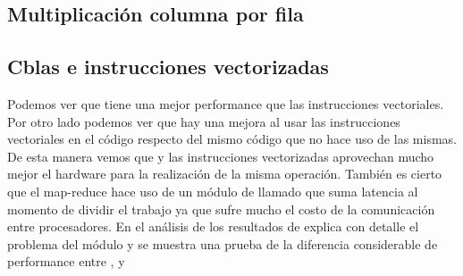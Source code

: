 \subsection{Multiplicación columna por fila}

    \def\model{ColumnByRow}
    \def\analisisAmdahl{
    Podemos observar que el speed up teórico tiende al máximo speed-up
    mientras que el real nos muestra que no usa toda la paralelizacion ya que al
    pasar de 1 a 2 threads, el tiempo no cae a la mitad, y al pasar de 1 a 4 threads
    tampoco. Se puede ver que tiene un speed-up de casi 2 lo cual quiere decir que
    hace uso de la mitad.
    }
    \def\analisisGustafson{
    Podemos ver que estos resultados demuestran que la sección serie del
    problema se mantiene casi constante respecto de la sección paralela
    que varía en forma ascendente con el tamaño de los datos de entrada.
    Pero además podemos observar que hay mucha ineficiencia respecto del uso de
    la paralelización ya que al aumentar el trabajo en casi el doble usando
    dos procesadores debería tardar aproximadamente lo mismo. Sin embargo vemos
    que el tiempo paralelo se duplicó, lo cual muestra que hay un problema de
    comunicación al aumentar el paralelismo. Mas adelante explicaremos que el
    módulo Pool es ineficiente respecto del uso de recursos
    }
    
    \newpage
    \clearpage

\subsection{Cblas e instrucciones vectorizadas}
    \def\text{Tiempo serie de multiplicación en segundos}
    \def\path{dgemm.png}
    \def\scale{.6}
    

    Podemos ver que  tiene una mejor performance que las instrucciones
    vectoriales. Por otro lado podemos ver que hay una mejora al usar las
    instrucciones vectoriales en el código  respecto del
    mismo código que no hace uso de las mismas.
    De esta manera vemos que  y las instrucciones vectorizadas
    aprovechan mucho mejor el hardware para la realización de la misma operación.
    También es cierto que el map-reduce hace uso de un módulo de 
    llamado  que suma latencia al momento de dividir el trabajo ya
    que sufre mucho el costo de la comunicación entre procesadores. En el análisis
    de los resultados de explica con detalle el problema del módulo 
    y se muestra una prueba de la diferencia considerable de performance entre
    ,  y 
